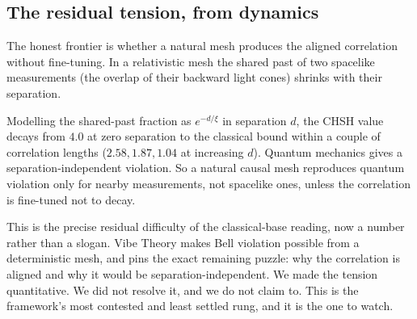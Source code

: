 \subsection{The residual tension, from dynamics}

The honest frontier is whether a natural mesh produces the aligned correlation without fine-tuning. In a relativistic mesh the shared past of two spacelike measurements (the overlap of their backward light cones) shrinks with their separation.

\begin{result}
Modelling the shared-past fraction as $e^{-d/\xi}$ in separation $d$, the CHSH value decays from $4.0$ at zero separation to the classical bound within a couple of correlation lengths ($2.58, 1.87, 1.04$ at increasing $d$). Quantum mechanics gives a separation-independent violation. So a natural causal mesh reproduces quantum violation only for nearby measurements, not spacelike ones, unless the correlation is fine-tuned not to decay.
\end{result}

This is the precise residual difficulty of the classical-base reading, now a number rather than a slogan. Vibe Theory makes Bell violation possible from a deterministic mesh, and pins the exact remaining puzzle: why the correlation is aligned and why it would be separation-independent. We made the tension quantitative. We did not resolve it, and we do not claim to. This is the framework's most contested and least settled rung, and it is the one to watch.
